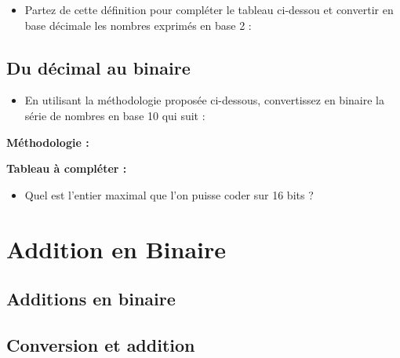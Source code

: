 \begin{itemize}
 \item  Partez de cette définition pour compléter le tableau ci-dessou et convertir en base décimale les nombres exprimés en base 2 : %
\end{itemize}



\subsection{Du décimal au binaire}
\begin{itemize}
 \item En utilisant la méthodologie proposée ci-dessous, convertissez en binaire la série de nombres en base 10 qui suit :%
\end{itemize}

\textbf{Méthodologie :}



\textbf{Tableau à compléter :}



 \begin{itemize}
   \item  Quel est l'entier maximal que l'on puisse coder sur 16 bits ?
 \end{itemize}

\section{Addition en Binaire}

\subsection{Additions en binaire}



\subsection{Conversion et addition}

